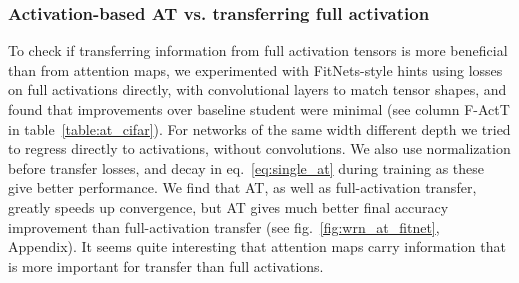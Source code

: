 \documentclass{article} \usepackage{iclr2017_conference}
\begin{document}
\subsubsection{Activation-based AT vs. transferring full activation}\label{sec:F-ActT}

To check if transferring information from full activation tensors is more beneficial than from attention maps, we experimented with FitNets-style hints using  losses on full activations directly, with  convolutional layers to match tensor shapes, and found that improvements over baseline student were minimal (see column F-ActT in table~\ref{table:at_cifar}). For networks of the same width different depth we tried to regress directly to activations, without  convolutions. We also use  normalization before transfer losses, and decay  in eq.~\ref{eq:single_at} during training as these give better performance. We find that AT, as well as full-activation transfer, greatly speeds up convergence, but AT gives much better final accuracy improvement than full-activation transfer (see fig.~\ref{fig:wrn_at_fitnet}, Appendix). It seems quite interesting that attention maps  carry information that is more important for transfer than full activations.
\end{document}
